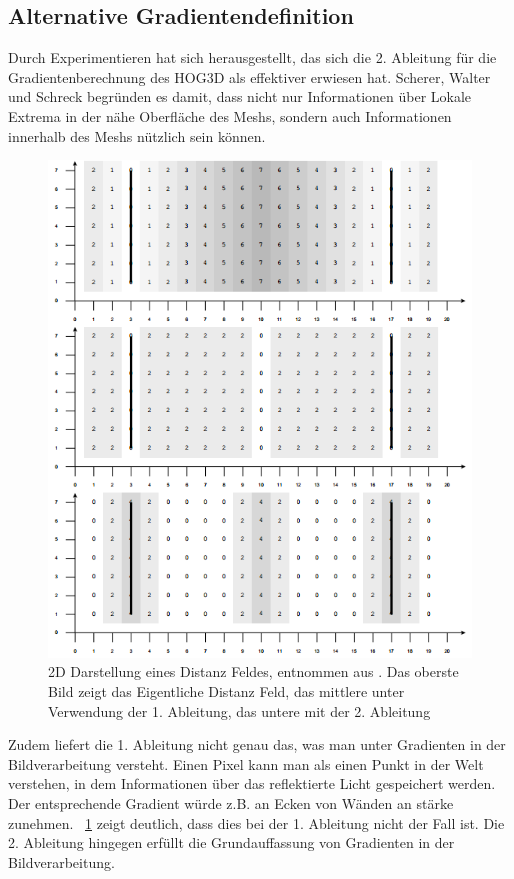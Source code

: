 \subsection{Alternative Gradientendefinition}
Durch Experimentieren hat sich herausgestellt, das sich die 2. Ableitung für die Gradientenberechnung des HOG3D als effektiver erwiesen hat. Scherer, Walter und Schreck \cite{scherer2010histograms} begründen es damit, dass nicht nur Informationen über Lokale Extrema in der nähe Oberfläche des Meshs, sondern auch Informationen innerhalb des Meshs nützlich sein können. 
 \begin{figure}[thpb]
 	\centering
 	\includegraphics[width=\linewidth]{3-Diskussion/pics/2D_distance_field.png}
 	\caption{2D Darstellung eines Distanz Feldes, entnommen aus \cite{scherer2010histograms}. Das oberste Bild zeigt das Eigentliche Distanz Feld, das mittlere unter Verwendung der 1. Ableitung, das untere mit der 2. Ableitung}
 	\label{2D_distance_field}
 \end{figure}
 Zudem liefert die 1. Ableitung nicht genau das, was man unter Gradienten in der Bildverarbeitung versteht. Einen Pixel kann man als einen Punkt in der Welt verstehen, in dem Informationen über das reflektierte Licht gespeichert werden. Der entsprechende Gradient würde z.B. an Ecken von Wänden an stärke zunehmen. \figurename~\ref{2D_distance_field} zeigt deutlich, dass dies bei der 1. Ableitung nicht der Fall ist. Die 2. Ableitung hingegen erfüllt die Grundauffassung von Gradienten in der Bildverarbeitung.
 \newline
 
 